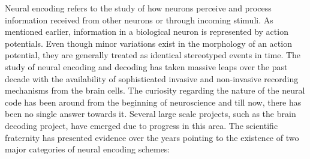 Neural encoding refers to the study of how neurons perceive and process information received from other neurons or through incoming stimuli. As mentioned earlier, information in a biological neuron is represented by action potentials. Even though minor variations exist in the morphology of an action potential, they are generally treated as identical stereotyped events in time. The study of neural encoding and decoding has taken massive leaps over the past decade with the availability of sophisticated invasive and non-invasive recording mechanisms from the brain cells. The curiosity regarding the nature of the neural code has been around from the beginning of neuroscience and till now, there has been no single answer towards it. Several large scale projects, such as the brain decoding project, \citep{tsien2013brain} have emerged due to progress in this area. The scientific fraternity has presented evidence over the years pointing to the existence of two major categories of neural encoding schemes: 
